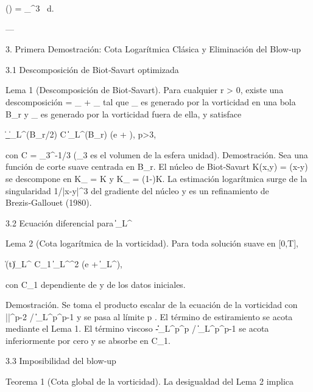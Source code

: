 \documentclass[12pt,twoside]{book}
\begin{document}
() =  \int_{^3}  \, d.

---

3. Primera Demostración: Cota Logarítmica Clásica y Eliminación del Blow‑up

3.1 Descomposición de Biot‑Savart optimizada

Lema 1 (Descomposición de Biot‑Savart). Para cualquier r > 0, existe una descomposición  = _{} + _{} tal que _{} es generado por la vorticidad en una bola B_r y _{} es generado por la vorticidad fuera de ella, y satisface

\|\nabla {}_{}\|_{L^\infty(B_{r/2})} \le C \|\boldsymbol{\omega}\|_{L^\infty(B_r)} \log\left(e + \right), \quad p>3,

con C = \omega_3^{-1/3} (\omega_3 es el volumen de la esfera unidad). Demostración. Sea \chi una función de corte suave centrada en B_r. El núcleo de Biot‑Savart K(x,y) = \nabla\Phi(x-y) se descompone en K_{} = \chi K y K_{} = (1-\chi)K. La estimación logarítmica surge de la singularidad 1/|x-y|^3 del gradiente del núcleo y es un refinamiento de Brezis‑Gallouet (1980).

3.2 Ecuación diferencial para \|\boldsymbol{\omega}\|_{L^\infty}

Lema 2 (Cota logarítmica de la vorticidad). Para toda solución suave en [0,T],

\|\boldsymbol{\omega}(t)\|_{L^\infty} \le C_1 \|\boldsymbol{\omega}\|_{L^\infty}^2 \log(e + \|\boldsymbol{\omega}\|_{L^\infty}),

con C_1 dependiente de \nu y de los datos iniciales.

Demostración. Se toma el producto escalar de la ecuación de la vorticidad con |\boldsymbol{\omega}|^{p-2}\boldsymbol{\omega} / \|\boldsymbol{\omega}\|_{L^p}^{p-1} y se pasa al límite p \to \infty. El término de estiramiento se acota mediante el Lema 1. El término viscoso -\nu\|\nabla\boldsymbol{\omega}\|_{L^p}^p / \|\boldsymbol{\omega}\|_{L^p}^{p-1} se acota inferiormente por cero y se absorbe en C_1.

3.3 Imposibilidad del blow‑up

Teorema 1 (Cota global de la vorticidad). La desigualdad del Lema 2 implica
\end{document}

